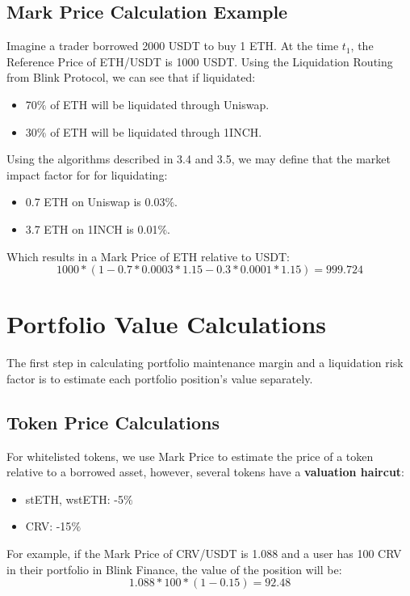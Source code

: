 \documentclass[letterpaper, 12pt]{article}
\begin{document}
\subsection{Mark Price Calculation Example}
Imagine a trader borrowed 2000 USDT to buy 1 ETH. At the time $t_{1}$, the Reference Price of ETH/USDT is 1000 USDT. Using the Liquidation Routing from Blink Protocol, we can see that if liquidated:
\begin{itemize}
	\item 70$\%$ of ETH will be liquidated through Uniswap.
	\item 30$\%$ of ETH will be liquidated through 1INCH.
\end{itemize}

Using the algorithms described in 3.4 and 3.5, we may define that the market impact factor for for liquidating:
\begin{itemize}
	\item 0.7 ETH on Uniswap is 0.03$\%$.
	\item 3.7 ETH on 1INCH is 0.01$\%$.
\end{itemize}

Which results in a Mark Price of ETH relative to USDT:
$$1000*(1-0.7*0.0003*1.15-0.3*0.0001*1.15)=999.724$$

\section{Portfolio Value Calculations}

The first step in calculating portfolio maintenance margin and a liquidation risk factor is to estimate each portfolio position's value separately.

\subsection{Token Price Calculations}

For whitelisted tokens, we use Mark Price to estimate the price of a token relative to a borrowed asset, however, several tokens have a \textbf{valuation haircut}:

\begin{itemize}
	\item stETH, wstETH: -5$\%$
	\item CRV: -15$\%$
\end{itemize}


For example, if the Mark Price of CRV/USDT is 1.088 and a user has 100 CRV in their portfolio in Blink Finance, the value of the position will be:
$$1.088 * 100 * (1-0.15)= 92.48$$
\end{document}
